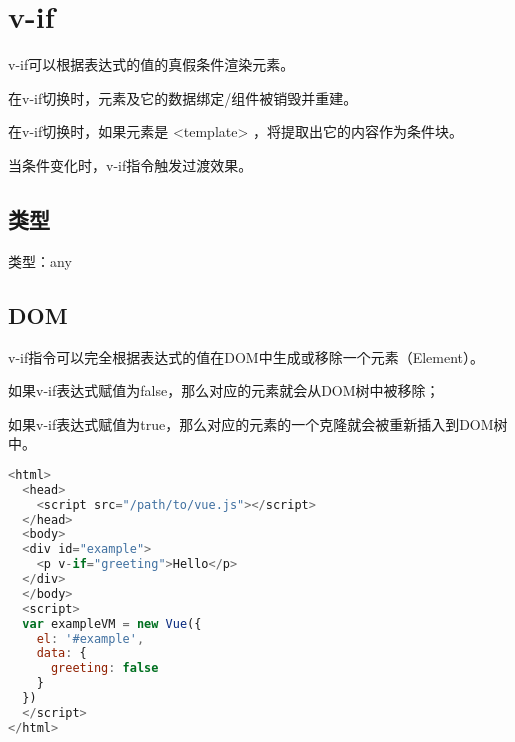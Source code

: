 \begin{lstlisting}[language=JavaScript]

\end{lstlisting}

\chapter{v-if}

v-if可以根据表达式的值的真假条件渲染元素。

\begin{compactitem}
\item 在v-if切换时，元素及它的数据绑定/组件被销毁并重建。
\item 在v-if切换时，如果元素是 <template> ，将提取出它的内容作为条件块。
\end{compactitem}

当条件变化时，v-if指令触发过渡效果。

\section{类型}


\begin{compactitem}
\item 类型：any
\end{compactitem}



\section{DOM}

v-if指令可以完全根据表达式的值在DOM中生成或移除一个元素（Element）。

\begin{compactitem}
\item 如果v-if表达式赋值为false，那么对应的元素就会从DOM树中被移除；
\item 如果v-if表达式赋值为true，那么对应的元素的一个克隆就会被重新插入到DOM树中。
\end{compactitem}


\begin{lstlisting}[language=JavaScript]
<html>
  <head>
    <script src="/path/to/vue.js"></script>
  </head>
  <body>
  <div id="example">
    <p v-if="greeting">Hello</p>
  </div>
  </body>
  <script>
  var exampleVM = new Vue({
    el: '#example',
    data: {
      greeting: false
    }
  })
  </script>
</html>
\end{lstlisting}

